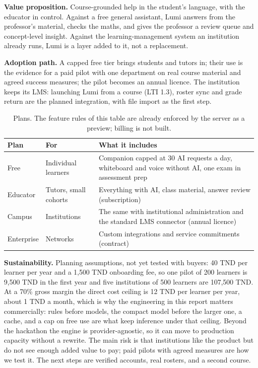 \documentclass[11pt,a4paper]{article}
\begin{document}
\textbf{Value proposition.} Course-grounded help in the student's language, with the educator in control. Against a
free general assistant, Lumi answers from the professor's material, checks the maths, and gives the professor a
review queue and concept-level insight. Against the learning-management system an institution already runs, Lumi is
a layer added to it, not a replacement.

\textbf{Adoption path.} A capped free tier brings students and tutors in; their use is the evidence for a paid pilot
with one department on real course material and agreed success measures; the pilot becomes an annual licence. The
institution keeps its LMS: launching Lumi from a course (LTI 1.3), roster sync and grade return are the planned
integration, with file import as the first step.

\begin{table}[H]
\centering\small
\begin{tabularx}{\textwidth}{@{}p{2.2cm}p{3.6cm}Y@{}}
\toprule
\textbf{Plan} & \textbf{For} & \textbf{What it includes} \\
\midrule
Free & Individual learners & Companion capped at 30 AI requests a day, whiteboard and voice without AI, one exam in assessment prep \\
Educator & Tutors, small cohorts & Everything with AI, class material, answer review (subscription) \\
Campus & Institutions & The same with institutional administration and the standard LMS connector (annual licence) \\
Enterprise & Networks & Custom integrations and service commitments (contract) \\
\bottomrule
\end{tabularx}
\caption{Plans. The feature rules of this table are already enforced by the server as a preview; billing is not built.}
\end{table}
\vspace{-6pt}

\textbf{Sustainability.} Planning assumptions, not yet tested with buyers: 40 TND per learner per year and a
1{,}500 TND onboarding fee, so one pilot of 200 learners is 9{,}500 TND in the first year and five institutions of
500 learners are 107{,}500 TND. At a 70\% gross margin the direct cost ceiling is 12 TND per learner per year, about
1 TND a month, which is why the engineering in this report matters commercially: rules before models, the compact
model before the larger one, a cache, and a cap on free use are what keep inference under that ceiling. Beyond the
hackathon the engine is provider-agnostic, so it can move to production capacity without a rewrite. The main risk is
that institutions like the product but do not see enough added value to pay; paid pilots with agreed measures are
how we test it. The next steps are verified accounts, real rosters, and a second course.
\end{document}
